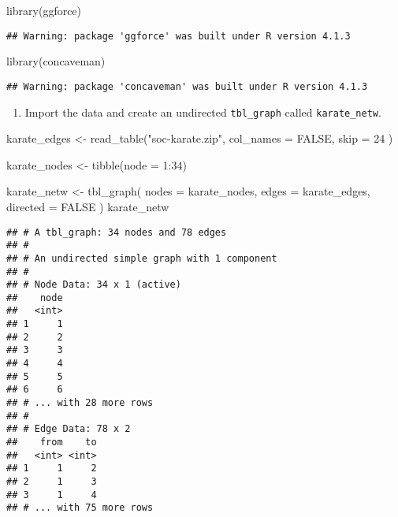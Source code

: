 \documentclass[
]{article}
\newenvironment{Shaded}{\begin{snugshade}}{\end{snugshade}}
\newcommand{\AttributeTok}[1]{\textcolor[rgb]{0.77,0.63,0.00}{#1}}
\newcommand{\ConstantTok}[1]{\textcolor[rgb]{0.00,0.00,0.00}{#1}}
\newcommand{\DecValTok}[1]{\textcolor[rgb]{0.00,0.00,0.81}{#1}}
\newcommand{\FunctionTok}[1]{\textcolor[rgb]{0.00,0.00,0.00}{#1}}
\newcommand{\NormalTok}[1]{#1}
\newcommand{\OtherTok}[1]{\textcolor[rgb]{0.56,0.35,0.01}{#1}}
\newcommand{\SpecialCharTok}[1]{\textcolor[rgb]{0.00,0.00,0.00}{#1}}
\newcommand{\StringTok}[1]{\textcolor[rgb]{0.31,0.60,0.02}{#1}}
\providecommand{\tightlist}{%
  \setlength{\itemsep}{0pt}\setlength{\parskip}{0pt}}
\begin{document}
\begin{Shaded}
\begin{Highlighting}[]
\FunctionTok{library}\NormalTok{(ggforce)}
\end{Highlighting}
\end{Shaded}

\begin{verbatim}
## Warning: package 'ggforce' was built under R version 4.1.3
\end{verbatim}

\begin{Shaded}
\begin{Highlighting}[]
\FunctionTok{library}\NormalTok{(concaveman)}
\end{Highlighting}
\end{Shaded}

\begin{verbatim}
## Warning: package 'concaveman' was built under R version 4.1.3
\end{verbatim}

\begin{enumerate}
\def\labelenumi{(\arabic{enumi})}
\tightlist
\item
  Import the data and create an undirected \texttt{tbl\_graph} called
  \texttt{karate\_netw}.
\end{enumerate}

\begin{Shaded}
\begin{Highlighting}[]
\NormalTok{karate\_edges }\OtherTok{\textless{}{-}} \FunctionTok{read\_table}\NormalTok{(}\StringTok{"soc{-}karate.zip"}\NormalTok{,}
  \AttributeTok{col\_names =} \ConstantTok{FALSE}\NormalTok{, }\AttributeTok{skip =} \DecValTok{24}
\NormalTok{)}

\NormalTok{karate\_nodes }\OtherTok{\textless{}{-}} \FunctionTok{tibble}\NormalTok{(}\AttributeTok{node =} \DecValTok{1}\SpecialCharTok{:}\DecValTok{34}\NormalTok{)}

\NormalTok{karate\_netw }\OtherTok{\textless{}{-}} \FunctionTok{tbl\_graph}\NormalTok{(}
  \AttributeTok{nodes =}\NormalTok{ karate\_nodes,}
  \AttributeTok{edges =}\NormalTok{ karate\_edges,}
  \AttributeTok{directed =} \ConstantTok{FALSE}
\NormalTok{)}
\NormalTok{karate\_netw}
\end{Highlighting}
\end{Shaded}

\begin{verbatim}
## # A tbl_graph: 34 nodes and 78 edges
## #
## # An undirected simple graph with 1 component
## #
## # Node Data: 34 x 1 (active)
##    node
##   <int>
## 1     1
## 2     2
## 3     3
## 4     4
## 5     5
## 6     6
## # ... with 28 more rows
## #
## # Edge Data: 78 x 2
##    from    to
##   <int> <int>
## 1     1     2
## 2     1     3
## 3     1     4
## # ... with 75 more rows
\end{verbatim}
\end{document}
